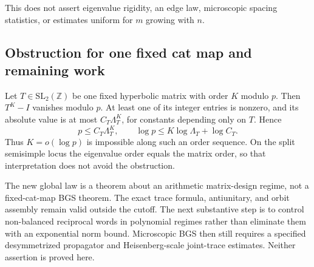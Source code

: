This does not assert eigenvalue rigidity, an edge law, microscopic spacing statistics, or estimates uniform for \(m\) growing with \(n\).

\subsection{Obstruction for one fixed cat map and remaining work}\label{magnetic:obstruction-for-one-fixed-cat-map-and-remaining-work}

Let \(T\in\mathrm{SL}_2(\mathbb Z)\) be one fixed hyperbolic matrix with order \(K\) modulo \(p\). Then \(T^K-I\) vanishes modulo \(p\). At least one of its integer entries is nonzero, and its absolute value is at most \(C_T\Lambda_T^K\), for constants depending only on \(T\). Hence \[
 p\leq C_T\Lambda_T^K,\qquad \log p\leq K\log\Lambda_T+\log C_T. \tag{MQ.21}
\] Thus \(K=o(\log p)\) is impossible along such an order sequence. On the split semisimple locus the eigenvalue order equals the matrix order, so that interpretation does not avoid the obstruction.

The new global law is a theorem about an arithmetic matrix-design regime, not a fixed-cat-map BGS theorem. The exact trace formula, antiunitary, and orbit assembly remain valid outside the cutoff. The next substantive step is to control non-balanced reciprocal words in polynomial regimes rather than eliminate them with an exponential norm bound. Microscopic BGS then still requires a specified desymmetrized propagator and Heisenberg-scale joint-trace estimates. Neither assertion is proved here.

